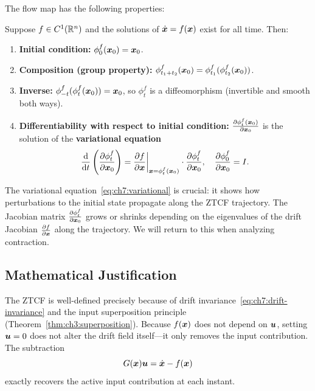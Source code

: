 The flow map has the following properties:

\begin{proposition}
\label{prop:ch7:flow-properties}
Suppose $f\in C^1(\mathbb{R}^n)$ and the solutions of $\dot{\bm{x}} = f(\bm{x})$ exist for all time. Then:
\begin{enumerate}
\item \textbf{Initial condition:} $\phi_0^f(\bm{x}_0) = \bm{x}_0$.
\item \textbf{Composition (group property):} $\phi_{t_1+t_2}^f(\bm{x}_0) = \phi_{t_1}^f(\phi_{t_2}^f(\bm{x}_0))$.
\item \textbf{Inverse:} $\phi_{-t}^f(\phi_t^f(\bm{x}_0)) = \bm{x}_0$, so $\phi_t^f$ is a diffeomorphism (invertible and smooth both ways).
\item \textbf{Differentiability with respect to initial condition:}
      $\frac{\partial \phi_t^f(\bm{x}_0)}{\partial \bm{x}_0}$ is the solution of the \textbf{variational equation}
      \begin{equation}
      \frac{\mathrm{d}}{\mathrm{d}t}\left(\frac{\partial \phi_t^f}{\partial \bm{x}_0}\right) =
      \frac{\partial f}{\partial\bm{x}}\bigg|_{\bm{x}=\phi_t^f(\bm{x}_0)} \cdot \frac{\partial \phi_t^f}{\partial \bm{x}_0},
      \quad
      \frac{\partial \phi_0^f}{\partial \bm{x}_0} = I.
      \label{eq:ch7:variational}
      \end{equation}
\end{enumerate}
\end{proposition}

The variational equation~\eqref{eq:ch7:variational} is crucial: it shows how perturbations
to the initial state propagate along the ZTCF trajectory. The Jacobian matrix
$\frac{\partial \phi_t^f}{\partial \bm{x}_0}$ grows or shrinks depending on the eigenvalues of
the drift Jacobian $\frac{\partial f}{\partial\bm{x}}$ along the trajectory. We will return to
this when analyzing contraction.

\subsection{Mathematical Justification}

The ZTCF is well-defined precisely because of drift invariance~\eqref{eq:ch7:drift-invariance}
and the input superposition principle (Theorem~\ref{thm:ch3:superposition}). Because
$f(\bm{x})$ does not depend on $\bm{u}$, setting $\bm{u}=0$ does not alter the drift field
itself---it only removes the input contribution. The subtraction
\begin{equation}
G(\bm{x})\bm{u} = \dot{\bm{x}} - f(\bm{x})
\label{eq:ch7:input-recovery}
\end{equation}
exactly recovers the active input contribution at each instant.


